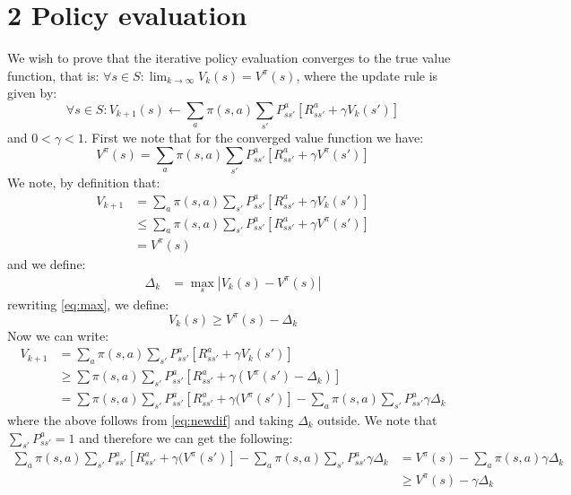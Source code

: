 \documentclass{article}
\begin{document}
\section{2 Policy evaluation}
We wish to prove that the iterative policy evaluation converges to the true value function, that is: $\forall s \in S : \lim_{k\rightarrow \infty} V_k(s) = V^\pi(s)$, where the update rule is given by:
\begin{equation}
\forall s \in S : V_{k+1}(s) \leftarrow \sum\limits_a \pi(s,a) \sum\limits_{s'} P^a_{ss'} [ R^a_{ss'} + \gamma V_k(s')]
\end{equation}
and  $0 < \gamma < 1$. First we note that for the converged value function we have:
\begin{equation}
V^\pi(s) = \sum\limits_a \pi(s,a) \sum\limits_{s'} P^a_{ss'} [ R^a_{ss'} + \gamma V^\pi(s')]
\end{equation}
We note, by definition that:
\begin{align}
V_{k+1} &= \sum\limits_a \pi(s,a) \sum\limits_{s'} P^a_{ss'} [ R^a_{ss'} + \gamma V_k(s')] \\
&\leq \sum\limits_a \pi(s,a) \sum\limits_{s'} P^a_{ss'} [ R^a_{ss'} + \gamma V^\pi(s')] \\
&= V^\pi(s)
\end{align}
and we define:
\begin{align}
\label{eq:max}
\Delta_k &= \max_s | V_k(s) - V^\pi(s)|
\end{align}
rewriting \eqref{eq:max}, we define:
\begin{equation}
\label{eq:newdif}
V_k(s) \geq V^\pi(s) - \Delta_k
\end{equation}
Now we can write:
\begin{align}
V_{k+1} &= \sum\limits_a \pi(s,a) \sum\limits_{s'} P^a_{ss'} [ R^a_{ss'} + \gamma V_k(s')] \\
&\geq \sum\limits \pi (s,a) \sum_{s'} P^a_{ss'} [R^a_{ss'} + \gamma(V^\pi(s') - \Delta_k)] \\
&= \sum\limits \pi (s,a) \sum_{s'} P^a_{ss'} [R^a_{ss'} + \gamma(V^\pi(s')] - \sum\limits_a \pi(s,a) \sum\limits_{s'} P^a_{ss'} \gamma \Delta_k
\end{align}
where the above follows from \eqref{eq:newdif} and taking $\Delta_k$ outside. We note that $\sum_{s'}P^a_{ss'} = 1$ and therefore we can get the following:
\begin{align}
\sum\limits_a \pi (s,a) \sum\limits_{s'} P^a_{ss'} [R^a_{ss'} + \gamma(V^\pi (s')] - \sum\limits_{a} \pi (s,a) \sum\limits_{s'} P^a_{ss'} \gamma \Delta_k &= V^\pi (s) - \sum\limits_{a} \pi (s,a) \gamma \Delta_k \\
&\geq V^\pi (s) - \gamma \Delta_k
\end{align}
\end{document}
